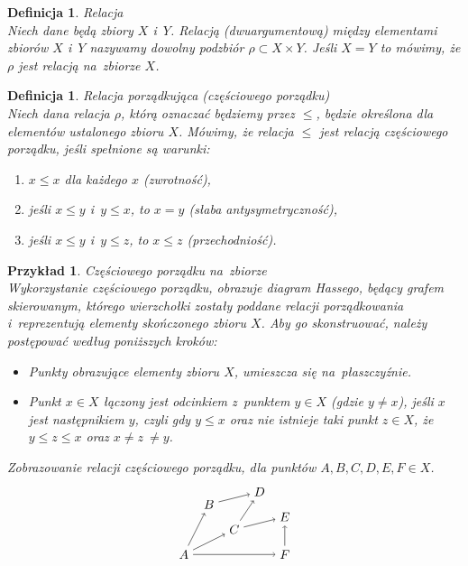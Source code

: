 \documentclass[12pt,a4paper]{report}
\newtheorem{definition}[theorem]{Definicja}
\newtheorem{example}{Przykład}
\begin{document}
\begin{definition}{Relacja \cite[Rozdział 3]{kuratowski2004}}\\
Niech dane będą zbiory $X$ i~$Y$. Relacją (dwuargumentową) między elementami zbiorów $X$ i~$Y$ nazywamy dowolny podzbiór $\rho \subset X \times Y $. Jeśli $X=Y$ to mówimy, że $\rho$ jest relacją na~zbiorze $X$. 
\end{definition} 


\begin{definition}{Relacja porządkująca (częściowego porządku) \cite[Rozdział 2]{blaszczyk2007}}\label{def-relacja-czesciowego-porzadku}\\
Niech dana relacja $\rho$, którą oznaczać będziemy przez $\leq$, będzie określona dla elementów ustalonego zbioru $X$. Mówimy, że relacja $\leq$ jest relacją częściowego porządku, jeśli spełnione są warunki:
\begin{enumerate}
\item $x \leq x$ dla każdego $x$ (zwrotność),
\item jeśli $x \leq y$ i~$y \leq x$, to $x=y$ (słaba antysymetryczność),
\item jeśli $x \leq y$ i~$y \leq z$, to $x \leq z$ (przechodniość).
\end{enumerate}
\end{definition}


\begin{example}{Częściowego porządku na~zbiorze}\label{przyklad-czesciowy-porzadek}\\
Wykorzystanie częściowego porządku, obrazuje diagram Hassego, będący grafem skierowanym, którego wierzchołki zostały poddane relacji porządkowania i~reprezentują elementy  skończonego zbioru $X$. 
Aby go skonstruować, należy postępować według poniższych kroków:
\begin{itemize}
\item Punkty obrazujące elementy zbioru $X$, umieszcza się na~płaszczyźnie.
\item Punkt $x\in X$ łączony jest odcinkiem z~punktem $y \in X$ (gdzie $y\neq x$), jeśli $x$ jest następnikiem $y$, czyli gdy $y \leq x$ oraz nie istnieje taki punkt $z \in X$, że $y\leq z\leq x$ oraz $x\neq z~\neq y$.
\end{itemize}
Zobrazowanie relacji częściowego porządku, dla punktów $A, B, C, D, E, F \in X$.
$$
\begin{tikzpicture}[scale=.7]
  \node (A) at (-1,0) {$A$};
  \node (B) at (0,2) {$B$};
  \node (C) at (1,1) {$C$};
 \node (E) at (3,1.5) {$E$};
 \node (F) at (3,0) {$F$};
 \node (D) at (2,2.5) {$D$};
 \draw [->](A) --(C);
 \draw [->](A) --(B);
 \draw [->](B) --(D);
 \draw [->](C) --(D);
 \draw [->](C) --(E);
 \draw [->](A) --(F);
 \draw [->](F) --(E);
 
\end{tikzpicture}
$$
\end{example}
\end{document}
